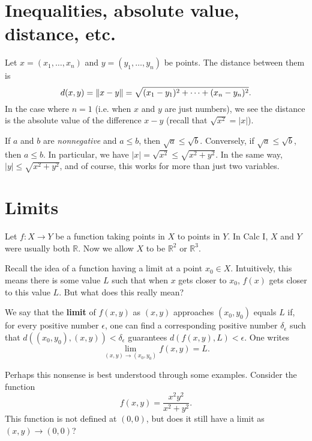 \documentclass{article}
\begin{document}


\section*{Inequalities, absolute value, distance, etc.}
Let $x=(x_1,\ldots,x_n)$ and $y=(y_1,\ldots,y_n)$ be points. The distance
between them is 
\[ d(x,y)=\norm{x-y}= \sqrt{(x_1-y_1)^2+\cdots+(x_n-y_n)^2} .\]
In the case where $n=1$ (i.e. when $x$ and $y$ are just numbers), we see
the distance is the absolute value of the difference $x-y$ (recall that $\sqrt{x^2}=|x|$).

If $a$ and $b$ are \emph{nonnegative} and $a\leq b$, then 
$\sqrt{a} \leq \sqrt{b}$. Conversely, if $\sqrt{a} \leq \sqrt{b}$, then $a\leq b$. In particular,
we have $|x|=\sqrt{x^2} \leq \sqrt{x^2 + y^2}$. In the same way, $|y| \leq \sqrt{x^2+y^2}$, and of course,
this works for more than just two variables.

\section*{Limits}
Let $f: X \to Y$ be a function taking points in $X$ to points in $Y$. In Calc I, $X$ and $Y$ were usually both $\mathbb{R}$. Now we allow $X$ to be $\mathbb{R}^2$ or $\mathbb{R}^3$.  

Recall the idea of a function having a limit at a point $x_0 \in X$. Intuitively, this means there is
some value $L$ such that when $x$ gets closer to $x_0$, $f(x)$ gets closer to this value $L$. But what does 
this really mean?

\begin{definition}
    We say that the \textbf{limit} of $f(x,y)$ as $(x,y)$ approaches $(x_0,y_0)$ equals $L$ if, 
    for every positive number $\epsilon$, one can find a corresponding positive number $\delta_\epsilon$ such that
    $d((x_0,y_0),(x,y)) < \delta_\epsilon$ guarantees $d(f(x,y),L) < \epsilon$. One writes
    \[\lim_{(x,y)\to (x_0,y_0)} f(x,y) = L.\]
\end{definition}


Perhaps this nonsense is best understood through some examples. Consider the function 
\[f(x,y)=\frac{x^2 y^2}{x^2+y^2}.\]
This function is not defined at $(0,0)$, but does it still have a limit as $(x,y) \to (0,0)$? 
\end{document}
